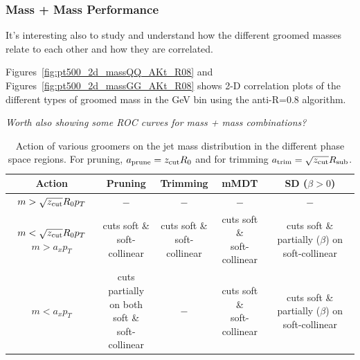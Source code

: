 \subsubsection*{Mass + Mass Performance}
\label{sec:wtag_massplusmass}
It's interesting also to study and understand how the different
groomed masses relate to each other and how they are correlated.

Figures~\ref{fig:pt500_2d_massQQ_AKt_R08} and Figures~\ref{fig:pt500_2d_massGG_AKt_R08} shows 2-D correlation plots of
the different types of groomed mass in the  GeV bin using the anti-\kT R=0.8
algorithm.

{\it Worth also showing some ROC curves for mass + mass combinations?}


\begin{table}[htbp!]
\centering
\caption{Action of various groomers on the jet mass distribution in the different phase space regions.  For pruning, $a_\text{prune} = z_\text{cut} R_0$ and for trimming $a_\text{trim} = \sqrt{z_\text{cut}} R_\text{sub}$.}
\begin{tabular}{c|c|c|c|c} 
Action & Pruning & Trimming & mMDT & SD ($\beta > 0$) \\ \hline
$m>\sqrt{z_\text{cut}}R_0 p_T$  &  $-$ & $-$ &  $-$  & $-$ \\ \hline
\parbox[c][3em][c]{7em}{$m<\sqrt{z_\text{cut}}R_0 p_T$\\$m>a_x p_T$} & \parbox[c][3em][c]{6em}{cuts soft \& \\ soft-collinear}  & \parbox[c][3em][c]{6em}{cuts soft \& \\ soft-collinear} & \parbox[c][3em][c]{6em}{cuts soft \& \\ soft-collinear} & \parbox[c][5em][c]{7em}{cuts soft \& \\ partially ($\beta$) \\ on soft-collinear}  \\ \hline
$m<a_x p_T$ & \parbox[c][5em][c]{7em}{cuts partially \\ on both soft \& \\  soft-collinear}   &$-$ & \parbox[c][3em][c]{6em}{cuts soft \& \\ soft-collinear} & \parbox[c][5em][c]{7em}{cuts soft \& \\ partially ($\beta$) \\ on soft-collinear} 
\end{tabular}
\label{tab:boostedtoprates}
\end{table}


